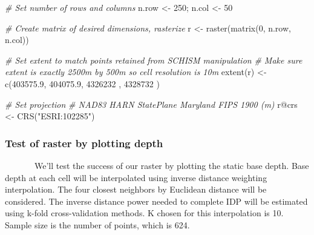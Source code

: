 \documentclass[
]{article}
\newenvironment{Shaded}{\begin{snugshade}}{\end{snugshade}}
\newcommand{\CommentTok}[1]{\textcolor[rgb]{0.56,0.35,0.01}{\textit{#1}}}
\newcommand{\DecValTok}[1]{\textcolor[rgb]{0.00,0.00,0.81}{#1}}
\newcommand{\FloatTok}[1]{\textcolor[rgb]{0.00,0.00,0.81}{#1}}
\newcommand{\FunctionTok}[1]{\textcolor[rgb]{0.00,0.00,0.00}{#1}}
\newcommand{\NormalTok}[1]{#1}
\newcommand{\OtherTok}[1]{\textcolor[rgb]{0.56,0.35,0.01}{#1}}
\newcommand{\SpecialCharTok}[1]{\textcolor[rgb]{0.00,0.00,0.00}{#1}}
\newcommand{\StringTok}[1]{\textcolor[rgb]{0.31,0.60,0.02}{#1}}
\begin{document}
\singlespacing

\begin{Shaded}
\begin{Highlighting}[]
\CommentTok{\# Set number of rows and columns}
\NormalTok{n.row }\OtherTok{\textless{}{-}} \DecValTok{250}\NormalTok{; n.col }\OtherTok{\textless{}{-}} \DecValTok{50}

\CommentTok{\# Create matrix of desired dimensions, rasterize}
\NormalTok{r }\OtherTok{\textless{}{-}} \FunctionTok{raster}\NormalTok{(}\FunctionTok{matrix}\NormalTok{(}\DecValTok{0}\NormalTok{, n.row, n.col))}

\CommentTok{\# Set extent to match points retained from SCHISM manipulation}
\CommentTok{\# Make sure extent is exactly 2500m by 500m so cell resolution is 10m}
\FunctionTok{extent}\NormalTok{(r) }\OtherTok{\textless{}{-}} \FunctionTok{c}\NormalTok{(}\FloatTok{403575.9}\NormalTok{, }\FloatTok{404075.9}\NormalTok{,}
               \DecValTok{4326232}\NormalTok{ , }\DecValTok{4328732}\NormalTok{  )}

\CommentTok{\# Set projection}
\CommentTok{\# NAD83 HARN StatePlane Maryland FIPS 1900 (m)}
\NormalTok{r}\SpecialCharTok{@}\NormalTok{crs }\OtherTok{\textless{}{-}} \FunctionTok{CRS}\NormalTok{(}\StringTok{"ESRI:102285"}\NormalTok{)}
\end{Highlighting}
\end{Shaded}

\newpage
\onehalfspacing

\hypertarget{test-of-raster-by-plotting-depth}{%
\subsubsection{Test of raster by plotting
depth}\label{test-of-raster-by-plotting-depth}}

~~~~~~~We'll test the success of our raster by plotting the static base
depth. Base depth at each cell will be interpolated using inverse
distance weighting interpolation. The four closest neighbors by
Euclidean distance will be considered. The inverse distance power needed
to complete IDP will be estimated using k-fold cross-validation methods.
K chosen for this interpolation is 10. Sample size is the number of
points, which is 624.

\singlespacing
\end{document}
